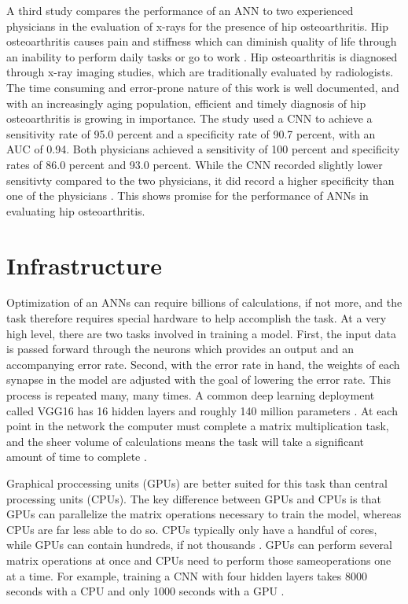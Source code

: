 \documentclass[sigconf]{acmart}
\begin{document}
A third study compares the performance of an ANN to two experienced physicians in the evaluation of x-rays for the presence of hip osteoarthritis. Hip osteoarthritis causes pain and stiffness which can diminish quality of life through an inability to perform daily tasks or go to work \cite{cite12}. Hip osteoarthritis is diagnosed through x-ray imaging studies, which are traditionally evaluated by radiologists. The time consuming and error-prone nature of this work is well documented, and with an increasingly aging population, efficient and timely diagnosis of hip osteoarthritis is growing in importance. The study used a CNN to achieve a sensitivity rate of 95.0 percent and a specificity rate of 90.7 percent, with an AUC of 0.94. Both physicians achieved a sensitivity of 100 percent and specificity rates of 86.0 percent and 93.0 percent. While the CNN recorded slightly lower sensitivty compared to the two physicians, it did record a higher specificity than one of the physicians \cite{cite12}. This shows promise for the performance of ANNs in evaluating hip osteoarthritis.

\section{Infrastructure}

Optimization of an ANNs can require billions of calculations, if not more, and the task therefore requires special hardware to help accomplish the task. At a very high level, there are two tasks involved in training a model. First, the input data is passed forward through the neurons which provides an output and an accompanying error rate. Second, with the error rate in hand, the weights of each synapse in the model are adjusted with the goal of lowering the error rate. This process is repeated many, many times. A common deep learning deployment called VGG16 has 16 hidden layers and roughly 140 million parameters \cite{cite14}. At each point in the network the computer must complete a matrix multiplication task, and the sheer volume of calculations means the task will take a significant amount of time to complete \cite{cite14}\cite{cite13}.

Graphical proccessing units (GPUs) are better suited for this task than central processing units (CPUs). The key difference between GPUs and CPUs is that GPUs can parallelize the matrix operations necessary to train the model, whereas CPUs are far less able to do so. CPUs typically only have a handful of cores, while GPUs can contain hundreds, if not thousands \cite{cite13}. GPUs can perform several matrix operations at once and CPUs need to perform those sameoperations one at a time. For example, training a CNN with four hidden layers takes 8000 seconds with a CPU and only 1000 seconds with a GPU \cite{cite13}.
\end{document}
